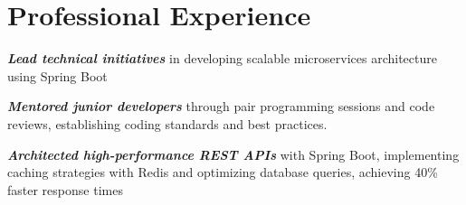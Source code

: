 \documentclass[]{deedy-resume-reversed}
\begin{document}
%
%

%
%

\begin{minipage}[t]{0.66\textwidth}


\section{Professional Experience}
 \hfill {}

\vspace{\topsep}
\begin{tightemize}
\item \textbf{\emph{Lead technical initiatives}} in developing scalable microservices architecture using Spring Boot
\item \textbf{\emph{Mentored junior developers}} through pair programming sessions and code reviews, establishing coding standards and best practices.
\item \textbf{\emph{Architected high-performance REST APIs}} with Spring Boot, implementing caching strategies with Redis and optimizing database queries, achieving 40\% faster response times
\end{tightemize}



\end{minipage}
\end{document}
